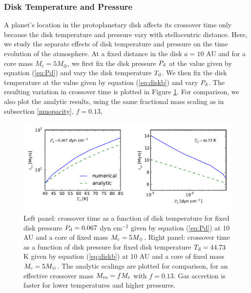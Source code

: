\documentclass[apj]{emulateapj}
\begin{document}
\subsubsection{Disk Temperature and Pressure}
\label{TPeffects}
 
A planet's location in the protoplanetary disk affects its crossover time only because the disk temperature and pressure vary with stellocentric distance. Here, we study the separate effects of disk temperature and pressure on the time evolution of the atmosphere. At a fixed distance in the disk $a=10$ AU and for a core mass $M_{\mathrm{c}}=5 M_{\oplus}$, we first fix the disk pressure $P_{\rm{d}}$ at the value given by equation (\ref{eq:Pd}) and vary the disk temperature $T_{\rm{d}}$. We then fix the disk temperature at the value given by equation (\ref{eq:diskb}) and vary $P_{\rm{d}}$. The resulting variation in crossover time is plotted in Figure \ref{fig:TPeffects}. For comparison, we also plot the analytic results, using the same fractional mass scaling as in subsection \ref{muopacity}, $f=0.13$, 

\begin{figure}[tb]
\centering
\includegraphics[width=1.\textwidth]{../../figs/ModelAtmospheres/RadSelfGravPoly/PaperFigs/TdPd_effect.pdf}
\caption{Left panel: crossover time as a function of disk temperature for fixed disk pressure $P_{\rm d}=0.067$ dyn cm$^{-2}$ given by equation (\ref{eq:Pd}) at 10 AU and a core of fixed mass $M_{\rm c}=5 M_{\oplus}$. Right panel: crossover time as a function of disk pressure for fixed disk temperature $T_{\rm d}=44.73$ K given by equation (\ref{eq:diskb}) at 10 AU and a core of fixed mass  $M_{\rm c}=5 M_{\oplus}$. The analytic scalings are plotted for comparison, for an effective crossover mass $M_{\rm{co}}=f M_{\rm c}$ with $f=0.13$. Gas accretion is faster for lower temperatures and higher pressures.} 
\label{fig:TPeffects}
\end{figure}
\end{document}
